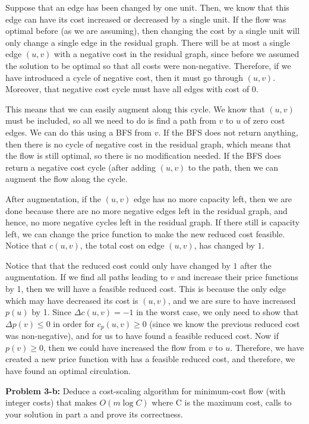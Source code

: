 \documentclass[psamsfonts]{amsart}
\newenvironment{sol}{\vspace{0.25cm}{\large \bfseries Solution:}}{\qedsymbol}
\newenvironment{prob}[1]{\begin{framed}{\large \bfseries Problem #1:}}{\end{framed}}
\begin{document}
\begin{sol}
Suppose that an edge has been changed by one unit. Then, we know that this edge can have its cost increased or decreased by a single unit. If the flow was optimal before (as we are assuming), then changing the cost by a single unit will only change a single edge in the residual graph. There will be at most a single edge $(u,v)$ with a negative cost in the residual graph, since before we assumed the solution to be optimal so that all costs were non-negative. Therefore, if we have introduced a cycle of negative cost, then it must go through $(u,v)$. Moreover, that negative cost cycle must have all edges with cost of 0. 

This means that we can easily augment along this cycle. We know that $(u,v)$ must be included, so all we need to do is find a path from $v$ to $u$ of zero cost edges. We can do this using a BFS from $v$. If the BFS does not return anything, then there is no cycle of negative cost in the residual graph, which means that the flow is still optimal, so there is no modification needed. If the BFS does return a negative cost cycle (after adding $(u,v)$ to the path, then we can augment the flow along the cycle. 

After augmentation, if the $(u,v)$ edge has no more capacity left, then we are done because there are no more negative edges left in the residual graph, and hence, no more negative cycles left in the residual graph. If there still is capacity left, we can change the price function to make the new reduced cost feasible. Notice that $c(u,v)$, the total cost on edge $(u,v)$, has changed by $1$. 

Notice that that the reduced cost could only have changed by $1$ after the augmentation. If we find all paths leading to $v$ and increase their price functions by 1, then we will have a feasible reduced cost. This is because the only edge which may have decreased its cost is $(u,v)$, and we are sure to have increased $p(u)$ by 1. Since $\Delta c(u,v) = -1$ in the worst case, we only need to show that $\Delta p(v) \leq 0$ in order for $c_p(u,v) \geq 0$ (since we know the previous reduced cost was non-negative), and for us to have found a feasible reduced cost. Now if $p(v) \geq 0$, then we could have increased the flow from $v$ to $u$. Therefore, we have created a new price function with has a feasible reduced cost, and therefore, we have found an optimal circulation.
\end{sol}

\begin{prob}{3-b}
Deduce a cost-scaling algorithm for minimum-cost flow (with integer costs) that makes $O(m \log C)$ where C is the maximum cost, calls to your solution in part a and prove its correctness.
\end{prob}
\end{document}
